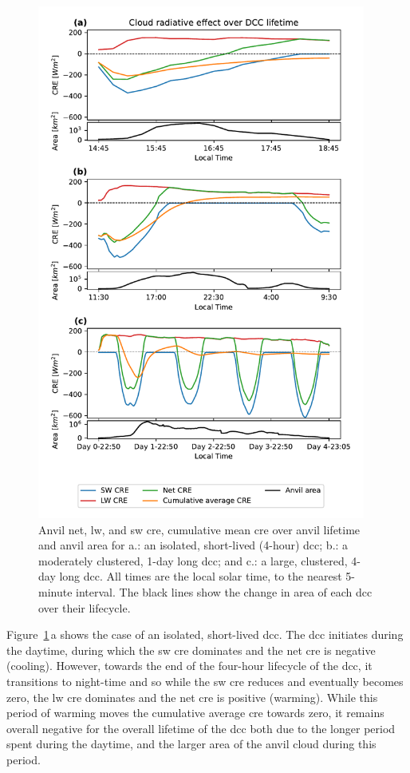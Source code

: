 \documentclass[acp, manuscript]{copernicus}
\begin{document}
\begin{figure}[tp]
    \centering
    \includegraphics[width=10.8cm]{figures/fig10.pdf}
    \caption[
    Anvil net, \acrshort{lw}, and \acrshort{sw} \acrshort{cre}, cumulative mean \acrshort{cre} over anvil lifetime
    ]{
    Anvil net, \acrshort{lw}, and \acrshort{sw} \acrshort{cre}, cumulative mean \acrshort{cre} over anvil lifetime and anvil area for a.: an isolated, short-lived (4-hour) \acrshort{dcc}; b.: a moderately clustered, 1-day long \acrshort{dcc}; and c.: a large, clustered, 4-day long \acrshort{dcc}. All times are the local solar time, to the nearest 5-minute interval. The black lines show the change in area of each \acrshort{dcc} over their lifecycle.
    }
    \label{fig:cre_lifecycle_examples}
\end{figure}


Figure~\ref{fig:cre_lifecycle_examples}\,a shows the case of an isolated, short-lived \acrshort{dcc}. 
The \acrshort{dcc} initiates during the daytime, during which the \acrshort{sw} \acrshort{cre} dominates and the net \acrshort{cre} is negative (cooling). 
However, towards the end of the four-hour lifecycle of the \acrshort{dcc}, it transitions to night-time and so while the \acrshort{sw} \acrshort{cre} reduces and eventually becomes zero, the \acrshort{lw} \acrshort{cre} dominates and the net \acrshort{cre} is positive (warming). 
While this period of warming moves the cumulative average \acrshort{cre} towards zero, it remains overall negative for the overall lifetime of the \acrshort{dcc} both due to the longer period spent during the daytime, and the larger area of the anvil cloud during this period.
\end{document}
